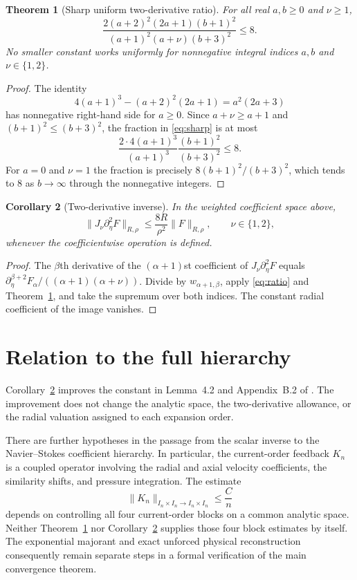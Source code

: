 \documentclass[11pt]{article}
\newtheorem{theorem}{Theorem}
\newtheorem{corollary}[theorem]{Corollary}
\begin{document}
\begin{theorem}[Sharp uniform two-derivative ratio]\label{thm:sharp}
For all real $a,b\geq0$ and $\nu\geq1$,
\begin{equation}\label{eq:sharp}
 \frac{2(a+2)^2(2a+1)(b+1)^2}
 {(a+1)^2(a+\nu)(b+3)^2}\leq8.
\end{equation}
No smaller constant works uniformly for nonnegative integral indices
$a,b$ and $\nu\in\{1,2\}$.
\end{theorem}

\begin{proof}
The identity
\[
 4(a+1)^3-(a+2)^2(2a+1)=a^2(2a+3)
\]
has nonnegative right-hand side for $a\geq0$.  Since
$a+\nu\geq a+1$ and $(b+1)^2\leq(b+3)^2$, the fraction in
\eqref{eq:sharp} is at most
\[
 \frac{2\cdot4(a+1)^3}{(a+1)^3}
 \frac{(b+1)^2}{(b+3)^2}
 \leq8.
\]
For $a=0$ and $\nu=1$ the fraction is precisely
$8(b+1)^2/(b+3)^2$, which tends to $8$ as $b\to\infty$
through the nonnegative integers.
\end{proof}

\begin{corollary}[Two-derivative inverse]\label{cor:inverse}
In the weighted coefficient space above,
\[
 \|J_\nu\partial_\eta^2F\|_{R,\rho}
 \leq \frac{8R}{\rho^2}\|F\|_{R,\rho},
 \qquad \nu\in\{1,2\},
\]
whenever the coefficientwise operation is defined.
\end{corollary}

\begin{proof}
The $\beta$th derivative of the $(\alpha+1)$st coefficient of
$J_\nu\partial_\eta^2F$ equals
$\partial_\eta^{\beta+2}F_\alpha/
 ((\alpha+1)(\alpha+\nu))$. Divide by $w_{\alpha+1,\beta}$,
apply \eqref{eq:ratio} and Theorem~\ref{thm:sharp}, and take
the supremum over both indices.  The constant radial
coefficient of the image vanishes.
\end{proof}

\section{Relation to the full hierarchy}
Corollary~\ref{cor:inverse} improves the constant in
Lemma~4.2 and Appendix~B.2 of \cite{newton2026}.  The improvement
does not change the analytic space, the two-derivative allowance,
or the radial valuation assigned to each expansion order.

There are further hypotheses in the passage from the scalar inverse
to the Navier--Stokes coefficient hierarchy.  In particular, the
current-order feedback $K_n$ is a coupled operator involving the
radial and axial velocity coefficients, the similarity shifts,
and pressure integration.  The estimate
\[
 \|K_n\|_{I_n\times I_n\to I_n\times I_n}\leq \frac{C}{n}
\]
depends on controlling all four current-order blocks on a common
analytic space.  Neither Theorem~\ref{thm:sharp} nor
Corollary~\ref{cor:inverse} supplies those four block estimates
by itself.  The exponential majorant and exact unforced physical
reconstruction consequently remain separate steps in a formal
verification of the main convergence theorem.
\end{document}

